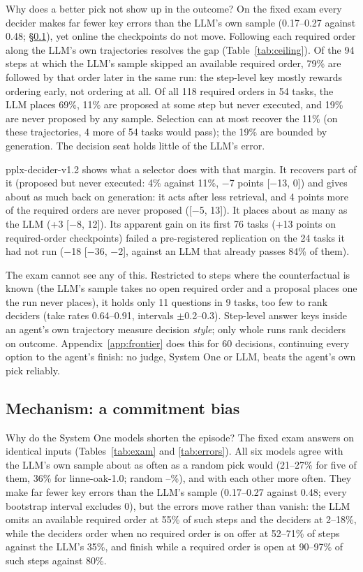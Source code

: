 \documentclass[11pt]{article}
\providecommand{\EXagreeRandom}{--}
\begin{document}
Why does a better pick not show up in the outcome? On the fixed exam every decider makes far fewer key errors than
the LLM's own sample (0.17--0.27 against 0.48; \S\ref{sec:commit}), yet online the checkpoints do not move. Following
each required order along the LLM's own trajectories resolves the gap (Table~\ref{tab:ceiling}). Of the 94 steps at
which the LLM's sample skipped an available required order, 79\% are followed by that order later in the same run:
the step-level key mostly rewards ordering early, not ordering at all. Of all 118 required orders in 54 tasks, the LLM
places 69\%, 11\% are proposed at some step but never executed, and 19\% are never proposed by any sample. Selection
can at most recover the 11\% (on these trajectories, 4 more of 54 tasks would pass); the 19\% are bounded by
generation. The decision seat holds little of the LLM's error.

pplx-decider-v1.2 shows what a selector does with that margin. It recovers part of it (proposed but never executed:
4\% against 11\%, $-$7 points [$-$13, 0]) and gives about as much back on generation: it acts after less retrieval, and
4 points more of the required orders are never proposed ([$-$5, 13]). It places about as many as the LLM (+3 [$-$8,
12]). Its apparent gain on its first 76 tasks (+13 points on required-order checkpoints) failed a pre-registered
replication on the 24 tasks it had not run ($-$18 [$-$36, $-$2], against an LLM that already passes 84\% of them).

The exam cannot see any of this. Restricted to steps where the counterfactual is known (the LLM's sample takes no open
required order and a proposal places one the run never places), it holds only 11 questions in 9 tasks, too few to
rank deciders (take rates 0.64--0.91, intervals $\pm$0.2--0.3). Step-level answer keys inside an agent's own
trajectory measure decision \emph{style}; only whole runs rank deciders on outcome. Appendix~\ref{app:frontier}
does this for 60 decisions, continuing every option to the agent's finish: no judge, System One or LLM, beats the
agent's own pick reliably.


\subsection{Mechanism: a commitment bias}\label{sec:commit}

Why do the System One models shorten the episode? The fixed exam answers
on identical inputs (Tables~\ref{tab:exam} and \ref{tab:errors}). All six models agree with the LLM's own sample
about as often as a random pick would (21--27\% for five of them, 36\% for linne-oak-1.0; random \EXagreeRandom\%), and with each other
more often. They make far fewer key errors than the LLM's sample (0.17--0.27 against 0.48; every bootstrap interval
excludes 0), but the errors move rather than vanish: the LLM omits an available required order at 55\% of such steps
and the deciders at 2--18\%, while the deciders order when no required order is on offer at 52--71\% of steps against
the LLM's 35\%, and finish while a required order is open at 90--97\% of such steps against 80\%.
\end{document}

